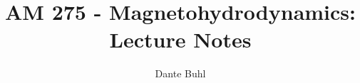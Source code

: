 \documentclass{article}
\begin{document}
\title{AM 275 - Magnetohydrodynamics: Lecture Notes}
\author{Dante Buhl}
\doublespacing

\newcommand{\wrms}{w_{\text{rms}}}
\newcommand{\bs}[1]{\boldsymbol{#1}}
\newcommand{\tb}[1]{\textbf{#1}}
\newcommand{\bmp}[1]{\begin{minipage}{#1\textwidth}}
\newcommand{\emp}{\end{minipage}}
\newcommand{\R}{\mathbb{R}}
\newcommand{\C}{\mathbb{C}}
\newcommand{\N}{\mathcal{N}}
\newcommand{\K}{\bs{\mathrm{K}}}
\newcommand{\m}{\bs{\mu}_*}
\newcommand{\s}{\bs{\Sigma}_*}
\newcommand{\dt}{\Delta t}
\newcommand{\dx}{\Delta x}
\newcommand{\tr}[1]{\text{Tr}(#1)}
\newcommand{\Tr}[1]{\text{Tr}(#1)}
\newcommand{\Div}{\nabla \cdot}
\renewcommand{\div}{\nabla \cdot}
\newcommand{\Curl}{\nabla \times}
\newcommand{\Grad}{\nabla}
\newcommand{\grad}{\nabla}
\newcommand{\grads}{\nabla_s}
\newcommand{\gradf}{\nabla_f}
\newcommand{\xs}{x_s}
\newcommand{\xf}{x_f}
\newcommand{\x}{\bs{x}}
\newcommand{\ts}{t_s}
\newcommand{\tf}{t_f}
\newcommand{\pt}{\partial t}
\newcommand{\pz}{\partial z}
\newcommand{\uvec}{\bs{u}}
\newcommand{\nvec}{\hat{\bs{n}}}
\newcommand{\jvec}{\bs{j}}
\newcommand{\bvec}{\bs{B}}
\newcommand{\B}{\bs{B}}
\newcommand{\evec}{\bs{E}}
\newcommand{\E}{\bs{E}}
\newcommand{\vort}{\bs{\omega}}
\newcommand{\F}{\bs{F}}
\newcommand{\T}{\tilde{T}}
\newcommand{\ez}{\bs{e}_z}
\newcommand{\ex}{\bs{e}_x}
\newcommand{\ey}{\bs{e}_y}
\newcommand{\thetahat}{\hat{\bs{\theta}}}
\newcommand{\rhat}{\hat{\bs{r}}}
\newcommand{\zhat}{\hat{\bs{z}}}
\newcommand{\eo}{\bs{e}_{\bs{\Omega}}}
\newcommand{\ppt}[1]{\frac{\partial #1}{\partial t}}
\newcommand{\pptwo}[2]{\frac{\partial^2 #1}{\partial #2^2}}
\newcommand{\ppthree}[2]{\frac{\partial^3 #1}{\partial #2^3}}
\newcommand{\pp}[2]{\frac{\partial #1}{\partial #2}}
\newcommand{\ddt}[1]{\frac{d #1}{d t}}
\newcommand{\DDt}[1]{\frac{D #1}{D t}}
\newcommand{\DD}[2]{\frac{D #1}{D #2}}
\newcommand{\ppts}[1]{\frac{\partial #1}{\partial t_s}}
\newcommand{\pptf}[1]{\frac{\partial #1}{\partial t_f}}
\newcommand{\ppz}[1]{\frac{\partial #1}{\partial z}}
\newcommand{\ddz}[1]{\frac{d #1}{d z}}
\newcommand{\ppzetas}[1]{\frac{\partial^2 #1}{\partial \zeta^2}}
\newcommand{\ppzs}[1]{\frac{\partial #1}{\partial z_s}}
\newcommand{\ppzf}[1]{\frac{\partial #1}{\partial z_f}}
\newcommand{\ppx}[1]{\frac{\partial #1}{\partial x}}
\newcommand{\ppxi}[1]{\frac{\partial #1}{\partial x_i}}
\newcommand{\ppxj}[1]{\frac{\partial #1}{\partial x_j}}
\newcommand{\ppy}[1]{\frac{\partial #1}{\partial y}}
\newcommand{\ppzeta}[1]{\frac{\partial #1}{\partial \zeta}}
\end{document}
